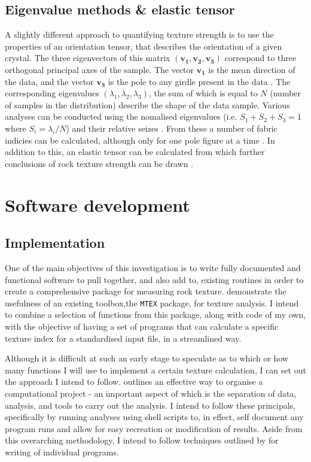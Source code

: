 \documentclass[a4paper,11pt]{article}
\numberwithin{equation}{section}
\begin{document}
\subsection{Eigenvalue methods \& elastic tensor}
A slightly different approach to quantifying texture strength is to use the properties of an orientation tensor, that describes the orientation of a given crystal. The three eigenvectors of this matrix $(\mathbf{v_1,v_2,v_3})$ correspond to three orthogonal principal axes of the sample. The vector $\mathbf{v_1}$ is the mean direction of the data, and the vector $\mathbf{v_3}$ is the pole to any girdle present in the data \citep{Woodcock}. The corresponding eigenvalues $(\lambda_1,\lambda_2,\lambda_3)$, the sum of which is equal to $N$ (number of samples in the distribution) describe the shape of the data sample. Various analyses can be conducted using the nomalised eigenvalues (i.e. $S_1 + S_2 + S_3 = 1$ where $S_i = {\lambda_i}/{N}$) and their relative seizes \citep{Lisle}. From these a number of fabric indicies can be calculated, although only for one pole figure at a time \citep{Ulrich}. In addition to this, an elastic tensor can be calculated from which further conclusions of rock texture strength can be drawn \citep{Mainprice}. 

\section{Software development} \label{sec:software}

\subsection{Implementation}
One of the main objectives of this investigation is to write fully documented and functional software to pull together, and also add to, existing routines in order to create a comprehensive package for measuring rock texture. \cite{Mainprice} demonstrate the usefulness of an existing toolbox,the \texttt{MTEX} package, for texture analysis. I intend to combine a selection of functions from this package, along with code of my own, with the objective of having a set of programs that can calculate a specific texture index for a standardised input file, in a streamlined way. 

Although it is difficult at such an early stage to speculate as to which or how many functions I will use to implement a certain texture calculation, I can set out the approach I intend to follow. \cite{FileStructure} outlines an effective way to organise a computational project - an important aspect of which is the separation of data, analysis, and tools to carry out the analysis. I intend to follow these principals, specifically by running analyses using shell scripts to, in effect, self document any program runs and allow for easy recreation or modification of results. Aside from this overarching methodology, I intend to follow techniques outlined by \cite{Computing} for writing of individual programs.     
\end{document}
